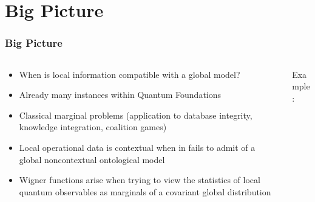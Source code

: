 \documentclass[
    9pt,
    hyperref={bookmarks=false, colorlinks=false}, %
    xcolor={dvipsnames},
]{beamer}
\begin{document}
\section{Big Picture}
\begin{frame}
    \frametitle{Big Picture}
    \begin{columns}
        \begin{column}{0.7\textwidth}
            \begin{itemize}
                \item When is local information compatible with a global model?
                \item Already many instances within Quantum Foundations
                \item Classical marginal problems (application to database integrity, knowledge integration, coalition games)\footnotemark{}
                \item Local operational data is contextual when in fails to admit of a global noncontextual ontological model\footnotemark{} 
                \item Wigner functions arise when trying to view the statistics of local quantum observables as marginals of a covariant global distribution 
            \end{itemize}
        \end{column}
        \begin{column}{0.3\textwidth}
            \begin{center}
                Example: \\

\end{center}
\end{column}
\end{columns}
\end{frame}
\end{document}
